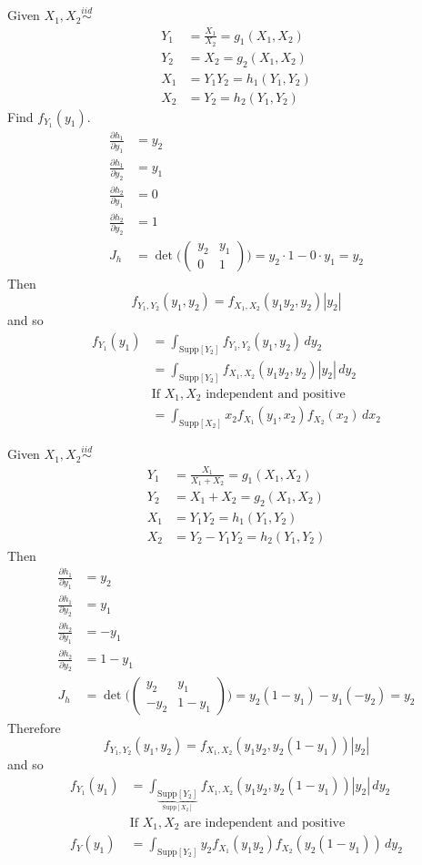 \documentclass[12pt]{article}
\newcommand{\iid}{\stackrel{iid}{\sim}}
\newcommand{\supp}[1]{\text{Supp}[ #1 ]}
\begin{document}
Given $X_1, X_2 \iid$ $$\begin{aligned} 
Y_1 &= \frac{X_1}{X_2} = g_1(X_1,X_2) \\ Y_2 &= X_2 = g_2(X_1, X_2) \\ X_1 &= Y_1Y_2 = h_1(Y_1, Y_2) \\ X_2 &= Y_2 = h_2(Y_1, Y_2) \end{aligned} $$ 
Find $f_{Y_1}(y_1)$. 
$$ \begin{aligned} 
\frac{\partial h_1}{\partial y_1} &= y_2 \\ \frac{\partial h_1}{\partial y_2} &= y_1 \\ \frac{\partial h_2}{\partial y_1} &= 0 \\ \frac{\partial h_2}{\partial y_2} &= 1 \\ J_h &= \det \Big( \begin{pmatrix} y_2 & y_1 \\ 0 & 1 \end{pmatrix} \Big) = y_2 \cdot 1 - 0 \cdot y_1 = y_2 \end{aligned} $$ 
Then $$f_{Y_1, Y_2}(y_1, y_2) = f_{X_1, X_2}(y_1y_2, y_2)|y_2| $$ 
and so $$ \begin{aligned} f_{Y_1}(y_1) &= \int_{\supp{Y_2}} f_{Y_1, Y_2}(y_1, y_2)\, dy_2 \\ &= \int_{\supp{Y_2}} f_{X_1, X_2}(y_1y_2, y_2) |y_2| \, dy_2 \\ &\text{If }X_1, X_2 \text{ independent and positive} \\ &= \int_{\supp{X_2}} x_2f_{X_1}(y_1, x_2)f_{X_2}(x_2) \, dx_2 \end{aligned} $$ 

Given $X_1, X_2 \iid$ $$\begin{aligned} 
Y_1 &= \frac{X_1}{X_1 + X_2} = g_1(X_1, X_2) \\
Y_2 &= X_1 + X_2 = g_2(X_1, X_2) \\ X_1 &= Y_1Y_2 = h_1(Y_1, Y_2) \\ 
X_2 &= Y_2 - Y_1Y_2 = h_2(Y_1, Y_2) \end{aligned} $$ 
Then $$ \begin{aligned} \frac{\partial h_1}{\partial y_1} &= y_2 \\ \frac{\partial h_1}{\partial y_2} &= y_1 \\ \frac{\partial h_2}{\partial y_1} &= -y_1 \\ \frac{\partial h_2}{\partial y_2} &= 1 - y_1 \\ J_h &= \det \Big( \begin{pmatrix} y_2 & y_1 \\ -y_2 & 1-y_1 \end{pmatrix} \Big) = y_2(1 - y_1) - y_1(-y_2) = y_2 \end{aligned} $$ 
Therefore $$f_{Y_1, Y_2}(y_1, y_2) = f_{X_1,X_2}(y_1y_2,y_2(1-y_1))|y_2|$$ and so
$$ \begin{aligned} f_{Y_1}(y_1) &= \int_{\underbrace{\supp{Y_2}}_{\supp{X_2}}} f_{X_1, X_2}(y_1y_2,y_2(1-y_1))|y_2| \, dy_2 \\ &\text{If }X_1,X_2 \text{ are independent and positive} \\ f_Y(y_1) &= \int_{\supp{Y_2}} y_2 f_{X_1}(y_1y_2)f_{X_2}(y_2(1-y_1)) \,dy_2 \end{aligned} $$ 
\end{document}
